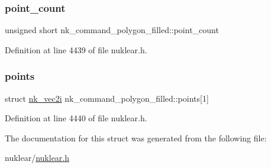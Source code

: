 \subsubsection{\texorpdfstring{point\+\_\+count}{point\_count}}
{\footnotesize\ttfamily unsigned short nk\+\_\+command\+\_\+polygon\+\_\+filled\+::point\+\_\+count}



Definition at line 4439 of file nuklear.\+h.

\mbox{\label{structnk__command__polygon__filled_a65b585227f390f0be21ce32828a09a99}} 
\subsubsection{\texorpdfstring{points}{points}}
{\footnotesize\ttfamily struct \mbox{\hyperlink{structnk__vec2i}{nk\+\_\+vec2i}} nk\+\_\+command\+\_\+polygon\+\_\+filled\+::points\mbox{[}1\mbox{]}}



Definition at line 4440 of file nuklear.\+h.



The documentation for this struct was generated from the following file\+:\begin{DoxyCompactItemize}
\item 
nuklear/\mbox{\hyperlink{nuklear_8h}{nuklear.\+h}}\end{DoxyCompactItemize}

